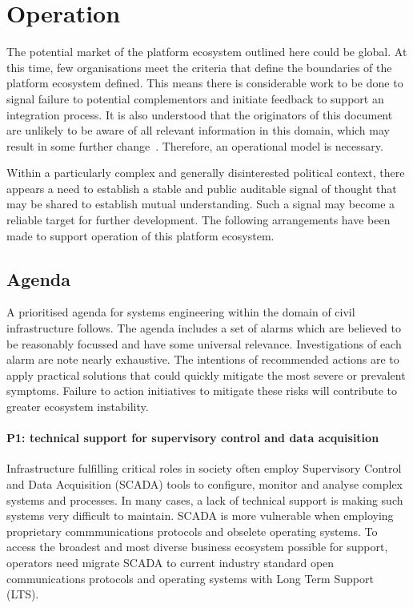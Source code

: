 \documentclass[11pt, oneside]{book}   	%
\begin{document}
\pagebreak

\chapter{Operation}
The potential market of the platform ecosystem outlined here could be global.
At this time, few organisations meet the criteria that define the boundaries of the platform ecosystem defined.
This means there is considerable work to be done to signal failure to potential complementors and initiate feedback to support an integration process.
It is also understood that the originators of this document are unlikely to be aware of all relevant information in this domain, which may result in some further change~\cite{ont1}.
Therefore, an operational model is necessary.\

Within a particularly complex and generally disinterested political context, there appears a need to establish a stable and public auditable signal of thought that may be shared to establish mutual understanding.
Such a signal may become a reliable target for further development.
The following arrangements have been made to support operation of this platform ecosystem.\

\section{Agenda}
A prioritised agenda for systems engineering within the domain of civil infrastructure follows.
The agenda includes a set of alarms which are believed to be reasonably focussed and have some universal relevance.
Investigations of each alarm are note nearly exhaustive.
The intentions of recommended actions are to apply practical solutions that could quickly mitigate the most severe or prevalent symptoms.
Failure to action initiatives to mitigate these risks will contribute to greater ecosystem instability.

\subsubsection{P1: technical support for supervisory control and data acquisition}

Infrastructure fulfilling critical roles in society often employ Supervisory Control and Data Acquisition (SCADA) tools to configure, monitor and analyse complex systems and processes.
In many cases, a lack of technical support is making such systems very difficult to maintain.
SCADA is more vulnerable when employing proprietary commmunications protocols and obselete operating systems.
To access the broadest and most diverse business ecosystem possible for support, operators need migrate SCADA to current industry standard open communications protocols and operating systems with Long Term Support (LTS).\
\end{document}
